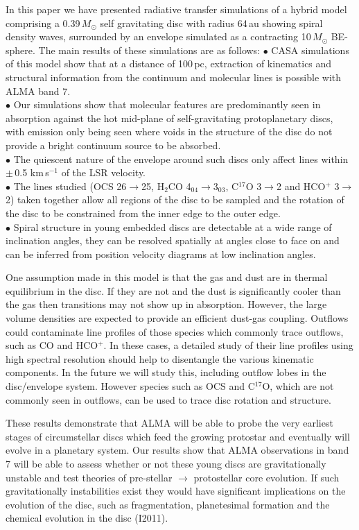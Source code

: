 \documentclass[useAMS,usenatbib]{mn2e}
\begin{document}
In this paper we have presented radiative transfer simulations of a hybrid model comprising a 0.39$\, M_\odot$ self gravitating disc with radius 64$\,$au showing spiral density waves, surrounded by an envelope simulated as a contracting 10$\,M_\odot$ BE-sphere. The main results of these simulations are as follows:\newline
$\bullet$ CASA simulations of this model show that at a distance of 100$\,$pc, extraction of kinematics and structural information from the continuum and molecular lines is possible with ALMA band 7.\\
$\bullet$ Our simulations show that molecular features are predominantly seen in absorption against the hot mid-plane of self-gravitating protoplanetary discs, with emission only being seen where voids in the structure of the disc do not provide a bright continuum source to be absorbed.\\
$\bullet$ The quiescent nature of the envelope around such discs only affect lines within $\pm\,$0.5 km$\,$s$^{-1}$ of the LSR velocity.\\
$\bullet$ The lines studied (OCS 26$\rightarrow$25, H$_2$CO 4$_{04}$$\rightarrow$3$_{03}$, C$^{17}$O 3$\rightarrow$2 and HCO$^+$ 3$\rightarrow$2) taken together allow all regions of the disc to be sampled and the rotation of the disc to be constrained from the inner edge to the outer edge.\\
$\bullet$ Spiral structure in young embedded discs are detectable at a wide range of inclination angles, they can be resolved spatially at angles close to face on and can be inferred from position velocity diagrams at low inclination angles.\smallskip


One assumption made in this model is that the gas and dust are in thermal equilibrium in the disc. If they are not and the dust is significantly cooler than the gas then transitions may not show up in absorption. However, the large volume densities are expected to provide an efficient dust-gas coupling. Outflows could contaminate line profiles of  those species  which commonly trace outflows, such as CO and HCO$^+$. In these cases, a detailed study of their line profiles using high spectral resolution should help to disentangle the various kinematic components.  In the future we will study this, including outflow lobes in the disc/envelope system.  However species such as OCS and C$^{17}$O, which are not commonly seen in outflows, can be used to trace disc rotation and structure.\smallskip

These results demonstrate that ALMA will be able to probe the very earliest stages of circumstellar discs which feed the growing protostar and eventually will evolve in a planetary system. Our results show that ALMA observations in band 7 will be able to assess whether or not these young discs are gravitationally unstable and test theories of pre-stellar $\rightarrow$ protostellar core evolution. If such gravitationally instabilities exist they would have significant implications on the evolution of the disc, such as fragmentation, planetesimal formation \citep{Boley2009,Johnson2013,Gibbons2012} and the chemical evolution in the disc (I2011). 
\end{document}
